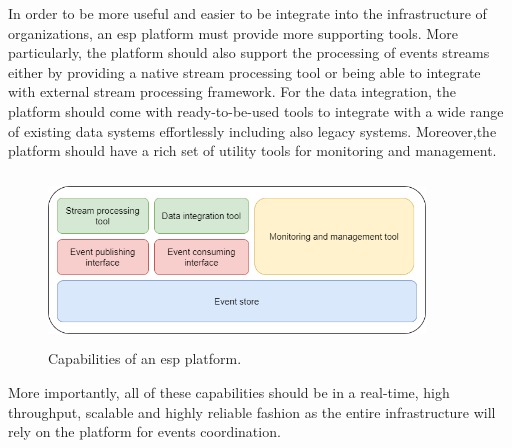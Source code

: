 In order to be more useful and easier to be integrate into the infrastructure of organizations, an \acrshort{esp} platform must provide more supporting tools. More particularly, the platform should also support the processing of events streams either by providing a native stream processing tool or being able to integrate with external stream processing framework. For the data integration, the platform should come with ready-to-be-used tools to integrate with a wide range of existing data systems effortlessly including also legacy systems. Moreover,the platform should have a rich set of utility tools for monitoring and management.

\begin{figure}[h]
	\centering
	\includegraphics[width=10cm,height=4.5cm]{images/espplatform.png}
	\caption{Capabilities of an \acrshort{esp} platform.}
	\label{fig:espplatform}
\end{figure}


More importantly, all of these capabilities should be in a real-time, high throughput, scalable and highly reliable fashion as the entire infrastructure will rely on the platform for events coordination. 




